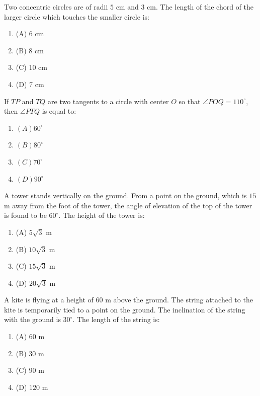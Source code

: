 \documentclass[12pt,a4paper]{exam}
\begin{document}
\begin{questions}
\question[1] Two concentric circles are of radii $5$ cm and $3$ cm. The length of the chord of the larger circle which touches the smaller circle is:
\begin{enumerate}[label=(\Alph*)]
  \item (A) 6 cm
  \item (B) 8 cm
  \item (C) 10 cm
  \item (D) 7 cm
\end{enumerate}
\vspace{0.15cm}

\question[1] If $TP$ and $TQ$ are two tangents to a circle with center $O$ so that $\angle POQ = 110^\circ$, then $\angle PTQ$ is equal to:
\begin{enumerate}[label=(\Alph*)]
  \item $(A) 60^\circ$
  \item $(B) 80^\circ$
  \item $(C) 70^\circ$
  \item $(D) 90^\circ$
\end{enumerate}
\vspace{0.15cm}

\question[1] A tower stands vertically on the ground. From a point on the ground, which is $15$ m away from the foot of the tower, the angle of elevation of the top of the tower is found to be $60^\circ$. The height of the tower is:
\begin{enumerate}[label=(\Alph*)]
  \item (A) $5\sqrt{3}$ m
  \item (B) $10\sqrt{3}$ m
  \item (C) $15\sqrt{3}$ m
  \item (D) $20\sqrt{3}$ m
\end{enumerate}
\vspace{0.15cm}

\question[1] A kite is flying at a height of $60$ m above the ground. The string attached to the kite is temporarily tied to a point on the ground. The inclination of the string with the ground is $30^\circ$. The length of the string is:
\begin{enumerate}[label=(\Alph*)]
  \item (A) $60$ m
  \item (B) $30$ m
  \item (C) $90$ m
  \item (D) $120$ m
\end{enumerate}
\vspace{0.15cm}


\end{questions}
\end{document}
